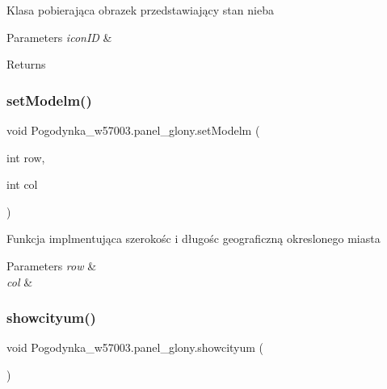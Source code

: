 Klasa pobierająca obrazek przedstawiający stan nieba 


\begin{DoxyParams}{Parameters}
{\em icon\+ID} & \\
\hline
\end{DoxyParams}
\begin{DoxyReturn}{Returns}

\end{DoxyReturn}
\mbox{\label{class_pogodynka__w57003_1_1panel__glony_af58e72c559c60a71a859212c03f33f69}} 
\subsubsection{\texorpdfstring{set\+Modelm()}{setModelm()}}
{\footnotesize\ttfamily void Pogodynka\+\_\+w57003.\+panel\+\_\+glony.\+set\+Modelm (\begin{DoxyParamCaption}\item[{int}]{row,  }\item[{int}]{col }\end{DoxyParamCaption})\hspace{0.3cm}{\ttfamily [private]}}



Funkcja implmentująca szerokośc i długośc geograficzną okreslonego miasta 


\begin{DoxyParams}{Parameters}
{\em row} & \\
\hline
{\em col} & \\
\hline
\end{DoxyParams}
\mbox{\label{class_pogodynka__w57003_1_1panel__glony_a58881a0fcdaac088f2ba3108cd62db63}} 
\subsubsection{\texorpdfstring{showcityum()}{showcityum()}}
{\footnotesize\ttfamily void Pogodynka\+\_\+w57003.\+panel\+\_\+glony.\+showcityum (\begin{DoxyParamCaption}{ }\end{DoxyParamCaption})\hspace{0.3cm}{\ttfamily [private]}}



